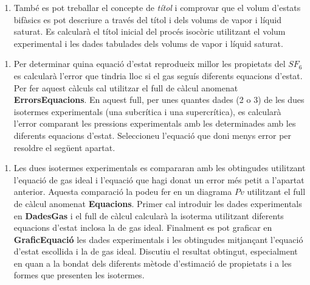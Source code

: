 \documentclass[a4paper]{article}
\begin{document}
\begin{enumerate}[resume]
    \item També es pot treballar el concepte de \emph{títol} i comprovar que el volum d’estats bifàsics es pot descriure a través del títol i dels volums de vapor i líquid saturat. Es calcularà el títol inicial del procés isocòric utilitzant el volum experimental i les dades tabulades dels volums de vapor i líquid saturat.
\end{enumerate}

\begin{enumerate}[resume]
    \item Per determinar quina equació d’estat reprodueix millor les propietats del $SF_6$ es calcularà l’error que tindria lloc si el gas seguís diferents equacions d’estat. Per fer aquest càlculs cal utilitzar el full de càlcul anomenat \textbf{ErrorsEquacions}. En aquest full, per unes quantes dades (2 o 3) de les dues isotermes experimentals (una subcrítica i una supercrítica), es calcularà l’error comparant les pressions experimentals amb les determinades amb les diferents equacions d’estat. Seleccioneu l’equació que doni menys error per resoldre el següent apartat.
\end{enumerate}

\begin{enumerate}[resume]
    \item Les dues isotermes experimentals es compararan amb les obtingudes utilitzant l’equació de gas ideal i l’equació que hagi donat un error més petit a l’apartat anterior. Aquesta comparació la podeu fer en un diagrama $Pv$ utilitzant el full de càlcul anomenat \textbf{Equacions}. Primer cal introduir les dades experimentals en \textbf{DadesGas} i el full de càlcul calcularà la isoterma utilitzant diferents equacions d’estat inclosa la de gas ideal. Finalment es pot graficar en \textbf{GraficEquació} les dades experimentals i les obtingudes mitjançant l’equació d’estat escollida i la de gas ideal. Discutiu el resultat obtingut, especialment en quan a la bondat dels diferents mètode d’estimació de propietats i a les formes que presenten les isotermes.
\end{enumerate}
\end{document}
